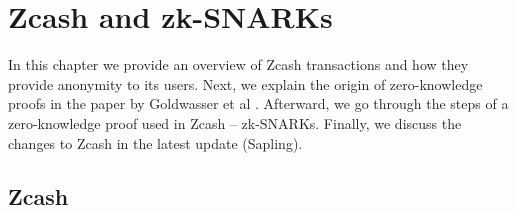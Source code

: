 
\chapter{Zcash and zk-SNARKs} %

\label{Chapter3} %

In this chapter we provide an overview of Zcash transactions and how they provide anonymity to its users. Next, we explain the origin of zero-knowledge proofs in the paper by Goldwasser et al \cite{goldwasser1985knowledge}. Afterward, we go through the steps of a zero-knowledge proof used in Zcash -- zk-SNARKs. Finally, we discuss the changes to Zcash in the latest update (Sapling).
\section{Zcash}

